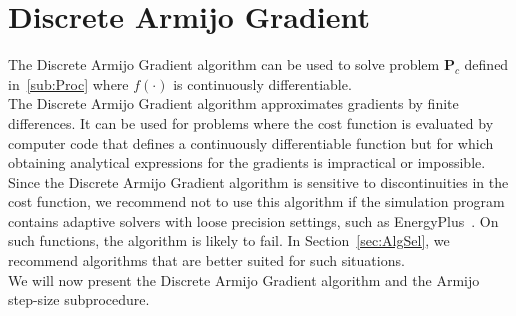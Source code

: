 \section{Discrete Armijo Gradient}
The Discrete Armijo Gradient algorithm can be used to solve
problem $\mathbf P_c$ defined in~\eqref{sub:Proc} where
$f(\cdot)$ is continuously differentiable.\\

The Discrete Armijo Gradient algorithm approximates gradients by finite differences.
It can be used for problems where the cost function is evaluated by
computer code that defines a continuously differentiable function but for
which obtaining analytical expressions for the gradients is impractical
or impossible.\\

Since the Discrete Armijo Gradient algorithm is sensitive to discontinuities in
the cost function, we recommend not to use this algorithm if the simulation program
contains adaptive solvers with loose precision settings, such as
EnergyPlus~\cite{Crawley2001:1}.
On such functions, the algorithm is likely to fail. 
In Section~\ref{sec:AlgSel}, we recommend algorithms that
are better suited for such situations.\\

We will now present the Discrete Armijo Gradient algorithm and the
Armijo step-size subprocedure.

